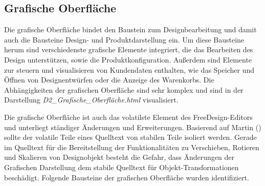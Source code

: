 \subsection{Grafische Oberfläche}
Die grafische Oberfläche bindet den Baustein zum Designbearbeitung und damit auch die Bausteine Design- und Produktdarstellung ein. Um diese Bausteine herum sind verschiedenste grafische Elemente integriert, die das Bearbeiten des Design unterstützen, sowie die Produktkonfiguration. Außerdem sind Elemente zur steuern  und visualisieren von Kundendaten enthalten, wie das Speicher und Öffnen von Designentwürfen oder die Anzeige des Warenkorbs.
Die Abhängigkeiten der grafischen Oberfläche sind sehr komplex und sind in der Darstellung \emph{D2\_Grafische\_Oberfläche.html} visualisiert. 

Die grafische Oberfläche ist auch das volatilste Element des FreeDesign-Editors und unterliegt ständiger Änderungen und Erweiterungen. Basierend auf Martin (\citeyear[119]{Martin2018}) sollte der volatile Teile eines Quelltext von stabilen Teile isoliert werden. Gerade im Quelltext für die Bereitstellung der Funktionalitäten zu Verschieben, Rotieren und Skalieren von Designobjekt besteht die Gefahr, dass Änderungen der Grafischen Darstellung dem stabile Quelltext für Objekt-Transformationen beschädigt. 
Folgende Bausteine der grafischen Oberfläche wurden identifiziert.

\begin{multicols}{2}    
    
\end{multicols}